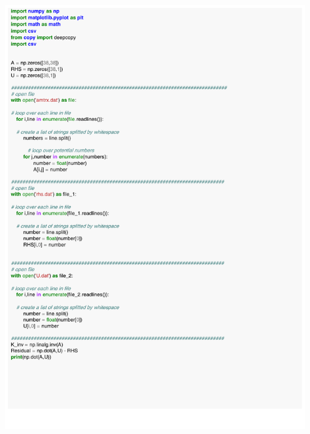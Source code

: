 \documentclass[12pt]{article}
\begin{document}
\begin{appendices}
\includegraphics[scale=0.93,page=1]{pro.pdf}

\end{appendices}
\end{document}
